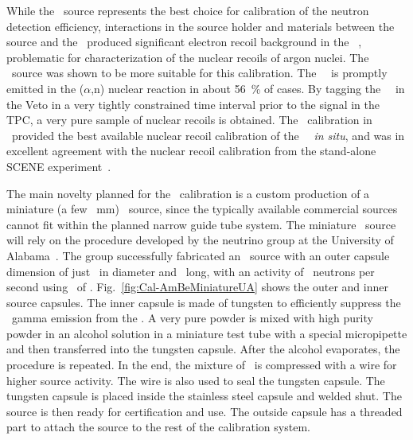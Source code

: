 While the \AmC\ source represents the best choice for calibration of the neutron detection efficiency, interactions in the source holder and materials between the source and the \TPC\ produced significant electron recoil background in the \DSfs\ \TPC, problematic for characterization of the nuclear recoils of argon nuclei. The \AmBe\ source was shown to be more suitable for this calibration. The \AmBeGammaEnergy\ \gr\ is promptly emitted in the ($\alpha$,n) nuclear reaction in about \SI{56}{\percent} of cases. By tagging the \AmBeGammaEnergy\ \gr\ in the Veto in a very tightly constrained time interval prior to the signal in the TPC, a very pure sample of nuclear recoils is obtained. The \AmBe\ calibration in \DSfs\ provided the best available nuclear recoil calibration of the \DSfs\ \TPC\ {\it in situ}, and was in excellent agreement with the nuclear recoil calibration from the stand-alone SCENE experiment~\cite{Cao:2015ks}.

The main novelty planned for the \AmBe\ calibration is a custom production of a miniature (a few \SI{}{\milli\meter}) \AmBe\ source, since the typically available commercial sources cannot fit within the planned narrow guide tube system. The miniature \AmBe\ source will rely on the procedure developed by the neutrino group at the University of Alabama~\cite{Ostrovkskiy:2012wv}. The group successfully fabricated an \AmBe\ source with an outer capsule dimension of just \CalAmBeSourceDiameter\ in diameter and \CalAmBeSourceLength\ long, with an activity of \CalAmBeSourceNeutronYield~neutrons per second using \CalAmBeAmSourceAmActivity\ of . Fig.~\ref{fig:Cal-AmBeMiniatureUA} shows the outer and inner source capsules. The inner capsule is made of tungsten to efficiently suppress the \CalAmCSourceGammasEnergy\ gamma emission from the . A very pure  powder is mixed with  high purity powder in an alcohol solution in a miniature test tube with a special micropipette and then transferred into the tungsten capsule. After the alcohol evaporates, the procedure is repeated. In the end, the mixture of \AmBe\ is compressed with a wire for higher source activity. The wire is also used to seal the tungsten capsule. The tungsten capsule is placed inside the stainless steel capsule and welded shut.  The source is then ready for certification and use. The outside capsule has a threaded part to attach the source to the rest of the calibration system.

